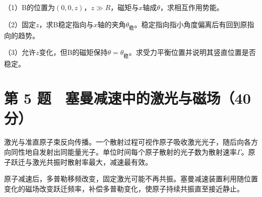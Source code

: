\documentclass[12pt,a4paper,fontset=fandol]{ctexart}
\begin{document}
\begin{center}
\begin{minipage}{\linewidth}
\centering\begingroup{}
\ifdim\wd\diagrambox>.88\linewidth
\sbox{\diagrambox}{\resizebox{.88\linewidth}{!}{\usebox{\diagrambox}}}\fi
\ifdim\ht\diagrambox>.20\textheight
\resizebox{!}{.20\textheight}{\usebox{\diagrambox}}
\else\usebox{\diagrambox}\fi
\par{}\endgroup\end{minipage}\end{center}

（1）B的位置为\((0,0,z)\)，\(z\gg R\)，磁矩与\(x\)轴成\(\theta\)，求相互作用势能。

（2）固定\(z\)，求B稳定指向与\(x\)轴的夹角\(\theta_{\text{稳}}\)。稳定指向指小角度偏离后有回到原指向的趋势。

（3）允许\(z\)变化，但B的磁矩保持\(\theta=\theta_{\text{稳}}\)。求受力平衡位置并说明其竖直位置是否稳定。

\clearpage

\section{第 5
题　塞曼减速中的激光与磁场（40分）}\label{ux7b2c-5-ux9898-ux585eux66fcux51cfux901fux4e2dux7684ux6fc0ux5149ux4e0eux78c1ux573a40ux5206}

激光与准直原子束反向传播。一个散射过程可视作原子吸收激光光子，随后向各方向同性地自发射出同能量光子。单位时间每个原子散射的光子数为散射速率\(\Gamma\)。原子跃迁与激光共振时散射率最大，减速最有效。

原子减速后，多普勒移频改变，固定激光可能不再共振。塞曼减速装置利用随位置变化的磁场改变跃迁频率，补偿多普勒变化，使原子持续共振直至接近静止。
\end{document}
